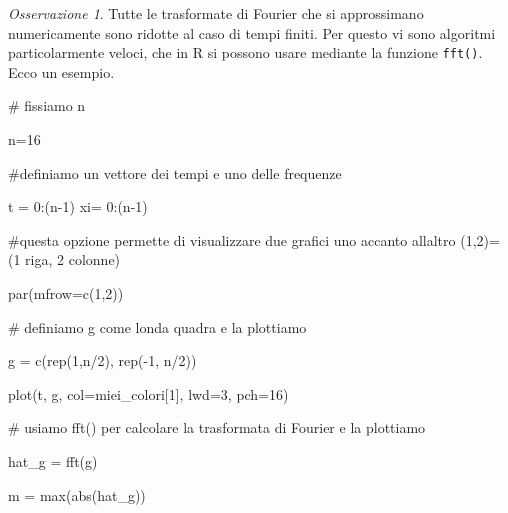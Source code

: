 \documentclass[
  italian,
  letterpaper,
]{book}
\newenvironment{Shaded}{\begin{snugshade}}{\end{snugshade}}
\newcommand{\AttributeTok}[1]{\textcolor[rgb]{0.40,0.45,0.13}{#1}}
\newcommand{\CommentTok}[1]{\textcolor[rgb]{0.37,0.37,0.37}{#1}}
\newcommand{\DecValTok}[1]{\textcolor[rgb]{0.68,0.00,0.00}{#1}}
\newcommand{\FunctionTok}[1]{\textcolor[rgb]{0.28,0.35,0.67}{#1}}
\newcommand{\NormalTok}[1]{\textcolor[rgb]{0.00,0.23,0.31}{#1}}
\newcommand{\OtherTok}[1]{\textcolor[rgb]{0.00,0.23,0.31}{#1}}
\newcommand{\SpecialCharTok}[1]{\textcolor[rgb]{0.37,0.37,0.37}{#1}}
\theoremstyle{definition}
\theoremstyle{remark}
\newtheorem*{remark}{Osservazione}
\begin{document}
\begin{remark}
Tutte le trasformate di Fourier che si approssimano numericamente sono
ridotte al caso di tempi finiti. Per questo vi sono algoritmi
particolarmente veloci, che in R si possono usare mediante la funzione
\texttt{fft()}. Ecco un esempio.

\begin{Shaded}
\begin{Highlighting}[]
\CommentTok{\# fissiamo n }

\NormalTok{n}\OtherTok{=}\DecValTok{16}

\CommentTok{\#definiamo un vettore dei tempi e uno delle frequenze}

\NormalTok{t }\OtherTok{=} \DecValTok{0}\SpecialCharTok{:}\NormalTok{(n}\DecValTok{{-}1}\NormalTok{)}
\NormalTok{xi}\OtherTok{=} \DecValTok{0}\SpecialCharTok{:}\NormalTok{(n}\DecValTok{{-}1}\NormalTok{)}

\CommentTok{\#questa opzione permette di visualizzare due grafici uno accanto all\textquotesingle{}altro (1,2)=(1 riga, 2 colonne)}

\FunctionTok{par}\NormalTok{(}\AttributeTok{mfrow=}\FunctionTok{c}\NormalTok{(}\DecValTok{1}\NormalTok{,}\DecValTok{2}\NormalTok{))}

\CommentTok{\# definiamo g come l\textquotesingle{}onda quadra e la plottiamo}

\NormalTok{g }\OtherTok{=} \FunctionTok{c}\NormalTok{(}\FunctionTok{rep}\NormalTok{(}\DecValTok{1}\NormalTok{,n}\SpecialCharTok{/}\DecValTok{2}\NormalTok{), }\FunctionTok{rep}\NormalTok{(}\SpecialCharTok{{-}}\DecValTok{1}\NormalTok{, n}\SpecialCharTok{/}\DecValTok{2}\NormalTok{))}

\FunctionTok{plot}\NormalTok{(t, g, }\AttributeTok{col=}\NormalTok{miei\_colori[}\DecValTok{1}\NormalTok{], }\AttributeTok{lwd=}\DecValTok{3}\NormalTok{, }\AttributeTok{pch=}\DecValTok{16}\NormalTok{)}

\CommentTok{\# usiamo fft() per calcolare la trasformata di Fourier e la plottiamo}

\NormalTok{hat\_g }\OtherTok{=} \FunctionTok{fft}\NormalTok{(g)}

\NormalTok{m }\OtherTok{=} \FunctionTok{max}\NormalTok{(}\FunctionTok{abs}\NormalTok{(hat\_g))}


\end{Highlighting}
\end{Shaded}
\end{remark}
\end{document}

